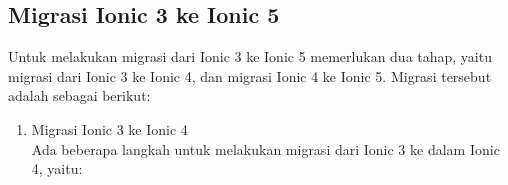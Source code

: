 \subsection{Migrasi Ionic 3 ke Ionic 5}
\label{subsec:migrasi}

Untuk melakukan migrasi dari Ionic 3 ke Ionic 5 memerlukan dua tahap, yaitu migrasi dari Ionic 3 ke Ionic 4, dan migrasi Ionic 4 ke Ionic 5. Migrasi tersebut adalah sebagai berikut:

\begin{enumerate}
	\item Migrasi Ionic 3 ke Ionic 4 \\
	Ada beberapa langkah untuk melakukan migrasi dari Ionic 3 ke dalam Ionic 4, yaitu:
	

\end{enumerate}
